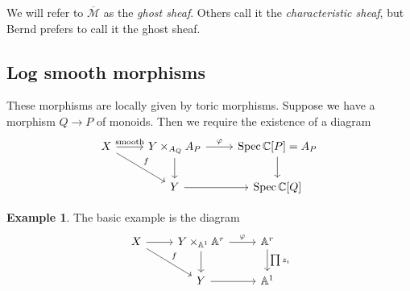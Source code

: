 \documentclass[leqno, openany]{memoir}
\theoremstyle{definition}
\newtheorem{exm}[thm]{Example}
\theoremstyle{remark}
\theoremstyle{plain}
\theoremstyle{definition}
\theoremstyle{remark}
\newcommand{\A}{\mathbb{A}}
\newcommand{\C}{\mathbb{C}}
\newcommand{\mc}[1]{\mathcal{#1}}
\newcommand{\ol}[1]{\overline{#1}}
\DeclareMathOperator{\Spec}{Spec}
\begin{document}
We will refer to $\ol{\mc{M}}$ as the \textit{ghost sheaf}. Others call it the \textit{characteristic sheaf}, but Bernd prefers to call it the ghost sheaf.

\subsection{Log smooth morphisms}
\label{subsec:log_smooth}

These morphisms are locally given by toric morphisms. Suppose we have a morphism $Q \to P$ of monoids. Then we require the existence of a diagram
\begin{equation*}
  \begin{tikzcd}
    X \ar{r}{\text{smooth}} \ar{dr}{f} & Y \times_{A_Q} A_P \ar{r}{\varphi} \ar{d} & \Spec \C[P] = A_P \ar{d} \\
    & Y \ar{r} & \Spec \C[Q]
  \end{tikzcd}
\end{equation*}

\begin{exm}
  The basic example is the diagram
\begin{equation*}
  \begin{tikzcd}
    X \ar{r} \ar{dr}{f} & Y \times_{\A^1} \A^r \ar{r}{\varphi} \ar{d} & \A^r\ar{d}{\prod z_i} \\
    & Y \ar{r} & \A^1
  \end{tikzcd}
\end{equation*}
\end{exm}
\end{document}
